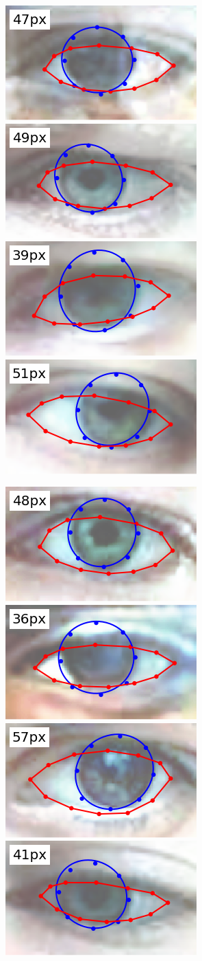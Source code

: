 \begin{figure}
    \centering
    \includegraphics[width=0.244\columnwidth]{figs/ldmks_examples/idx_0.png}\hfill
    \includegraphics[width=0.244\columnwidth]{figs/ldmks_examples/idx_55.png}\hfill
    \includegraphics[width=0.244\columnwidth]{figs/ldmks_examples/idx_160.png}\hfill
    \includegraphics[width=0.244\columnwidth]{figs/ldmks_examples/idx_133.png}
    \par \vspace{0.1em}
    \includegraphics[width=0.244\columnwidth]{figs/ldmks_examples/idx_122.png}\hfill
    \includegraphics[width=0.244\columnwidth]{figs/ldmks_examples/idx_145.png}\hfill
    \includegraphics[width=0.244\columnwidth]{figs/ldmks_examples/idx_171.png}\hfill
    \includegraphics[width=0.244\columnwidth]{figs/ldmks_examples/idx_75.png}

\end{figure}
